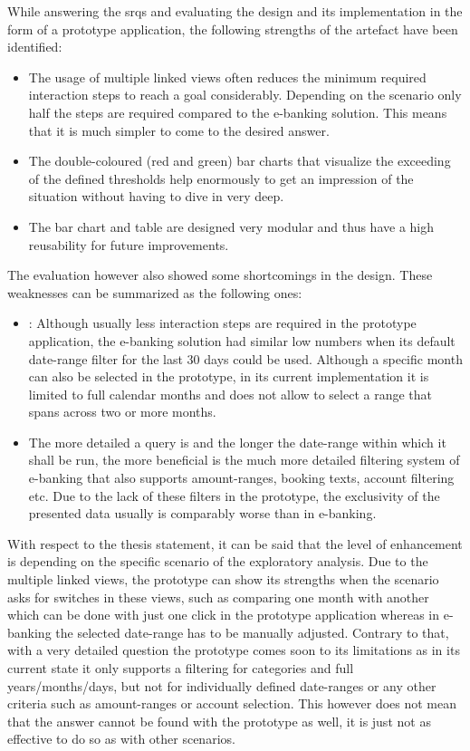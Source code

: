 While answering the \glspl{srq} and evaluating the design and its implementation in the form of a prototype application, the following strengths of the artefact have been identified:
\begin{itemize}[]
	\item The usage of multiple linked views often reduces the minimum required interaction steps to reach a goal considerably. Depending on the scenario only half the steps are required compared to the e-banking solution. This means that it is much simpler to come to the desired answer.
	\item The double-coloured (red and green) bar charts that visualize the exceeding of the defined thresholds help enormously to get an impression of the situation without having to dive in very deep.
	\item The bar chart and table are designed very modular and thus have a high reusability for future improvements.
\end{itemize}

The evaluation however also showed some shortcomings in the design. These weaknesses can be summarized as the following ones:
\begin{itemize}[]
	\item: Although usually less interaction steps are required in the prototype application, the e-banking solution had similar low numbers when its default date-range filter for the last 30 days could be used. Although a specific month can also be selected in the prototype, in its current implementation it is limited to full calendar months and does not allow to select a range that spans across two or more months.
	\item The more detailed a query is and the longer the date-range within which it shall be run, the more beneficial is the much more detailed filtering system of e-banking that also supports amount-ranges, booking texts, account filtering etc. Due to the lack of these filters in the prototype, the exclusivity of the presented data usually is comparably worse than in e-banking.
\end{itemize}

With respect to the thesis statement, it can be said that the level of enhancement is depending on the specific scenario of the exploratory analysis. Due to the multiple linked views, the prototype can show its strengths when the scenario asks for switches in these views, such as comparing one month with another which can be done with just one click in the prototype application whereas in e-banking the selected date-range has to be manually adjusted. Contrary to that, with a very detailed question the prototype comes soon to its limitations as in its current state it only supports a filtering for categories and full years/months/days, but not for individually defined date-ranges or any other criteria such as amount-ranges or account selection. This however does not mean that the answer cannot be found with the prototype as well, it is just not as effective to do so as with other scenarios.
\begin{framed}
	\textit{\thesisstatementtext}
\end{framed}

